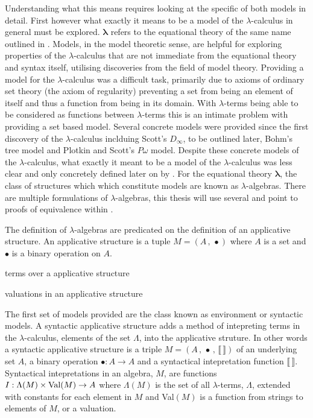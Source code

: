 Understanding what this means requires looking at the specific of both models in
detail. First however what exactly it means to be a model of the
$\lambda$-calculus in general must be explored. 
$\bm{\lambda}$ refers to the equational theory of the same name outlined in
. Models, in the model theoretic sense, are helpful for
exploring properties of the $\lambda$-calculus that are not immediate from the
equational theory and syntax itself, utilising discoveries from the field of
model theory. Providing a model for the $\lambda$-calculus was a difficult task,
primarily due to axioms of ordinary set theory (the axiom of regularity)
preventing a set from being an element of itself and thus a function from being
in its domain. With $\lambda$-terms being able to be considered as functions
between $\lambda$-terms this is an intimate problem with providing a set based
model. Several concrete models were provided since the first discovery of the
$\lambda$-calculus inclduing Scott's $D_{\infty}$, to be outlined later, Bohm's
tree model and Plotkin and Scott's $P\omega$ model. Despite these concrete
models of the $\lambda$-calculus, what exactly it meant to be a model of the
$\lambda$-calculus was less clear and only concretely defined later on by
. For the equational theory $\bm{\lambda}$, the
class of structures which which constitute models are known as
$\lambda$-algebras. There are multiple formulations of $\lambda$-algebras, this
thesis will use several and point to proofs of equivalence within
.

The definition of $\lambda$-algebras are predicated on the definition of an
applicative structure. An applicative structure is a tuple $M = (A \, , \,
\bullet)$ where $A$ is a set and $\bullet$ is a binary operation on $A$.

terms over a applicative structure

valuations in an applicative structure

The first set of models provided are the class known as environment or syntactic
models. A syntactic applicative structure adds a method of intepreting terms in
the $\lambda$-calculus, elements of the set $\Lambda$, into the applicative
struture. In other words a syntactic applicative structure is a triple $M = (A
\, , \, \bullet \, , \, \llbracket \, \rrbracket)$ of an underlying set $A$, a
binary operation $\bullet : A \rightarrow A$ and a syntactical intepretation
function $\llbracket \, \rrbracket$. Syntactical intepretations in an algebra,
$M$,  are functions $I : \Lambda(M) \times \textnormal{Val}(M) \rightarrow A$
where $\Lambda(M)$ is the set of all $\lambda$-terms, $\Lambda$, extended with
constants for each element in $M$ and Val$(M)$ is a function from strings to
elements of $M$, or a valuation.

